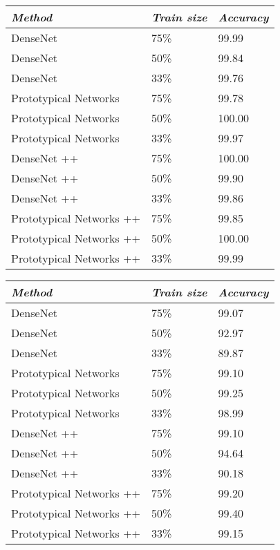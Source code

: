\begin{table}[h!]
\centering
\begin{tabular}{ p{15em} p{7em} p{8em}}
\toprule
\emph{Method} & \emph{Train size} & \emph{Accuracy} \\ \midrule
DenseNet \cite{densenet} & 75\% & 99.99 \\
DenseNet \cite{densenet} & 50\% & 99.84 \\
DenseNet \cite{densenet} & 33\% & 99.76 \\
Prototypical Networks \cite{protonet} & 75\% & 99.78 \\
Prototypical Networks \cite{protonet} & 50\% & 100.00 \\
Prototypical Networks \cite{protonet} & 33\% & 99.97 \\
DenseNet ++ \cite{densenet} & 75\% & 100.00 \\
DenseNet ++ \cite{densenet} & 50\% & 99.90 \\
DenseNet ++ \cite{densenet} & 33\% & 99.86 \\
Prototypical Networks ++ \cite{protonet} & 75\% & 99.85 \\
Prototypical Networks ++ \cite{protonet} & 50\% & 100.00 \\
Prototypical Networks ++ \cite{protonet} & 33\% & 99.99 \\
\bottomrule
\end{tabular}
\label{tab:results_reduced_ciarp}
\end{table}

\begin{table}[h!]
\centering
\begin{tabular}{ p{15em} p{7em} p{8em}}
\toprule
\emph{Method} & \emph{Train size} & \emph{Accuracy} \\ \midrule
DenseNet \cite{densenet} & 75\% & 99.07 \\
DenseNet \cite{densenet} & 50\% & 92.97 \\
DenseNet \cite{densenet} & 33\% & 89.87 \\
Prototypical Networks \cite{protonet} & 75\% & 99.10 \\
Prototypical Networks \cite{protonet} & 50\% & 99.25 \\
Prototypical Networks \cite{protonet} & 33\% & 98.99 \\
DenseNet ++ \cite{densenet} & 75\% & 99.10 \\
DenseNet ++ \cite{densenet} & 50\% & 94.64 \\
DenseNet ++ \cite{densenet} & 33\% & 90.18 \\
Prototypical Networks ++ \cite{protonet} & 75\% & 99.20 \\
Prototypical Networks ++ \cite{protonet} & 50\% & 99.40 \\
Prototypical Networks ++ \cite{protonet} & 33\% & 99.15 \\
\bottomrule
\end{tabular}
\label{tab:results_reduced_lsa16}
\end{table}

